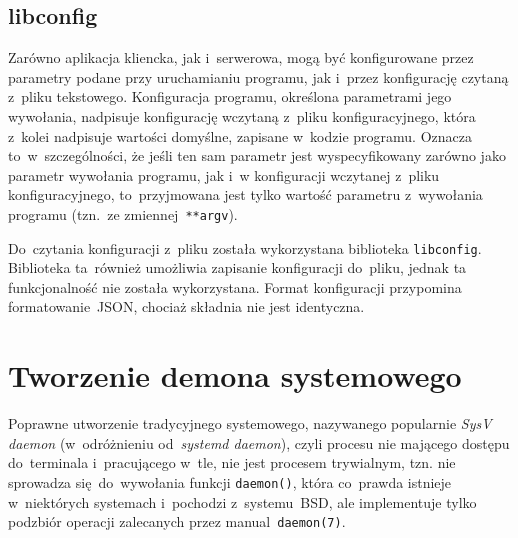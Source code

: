 \documentclass[thesis]{subfiles}
\begin{document}

\subsection{libconfig}

Zarówno aplikacja kliencka, jak i~serwerowa, mogą być konfigurowane przez parametry podane przy uruchamianiu programu, jak i~przez konfigurację czytaną z~pliku tekstowego. Konfiguracja programu, określona parametrami jego wywołania, nadpisuje konfigurację wczytaną z~pliku konfiguracyjnego, która z~kolei nadpisuje wartości domyślne, zapisane w~kodzie programu. Oznacza to~w~szczególności, że jeśli ten sam parametr jest wyspecyfikowany zarówno jako parametr wywołania programu, jak i~w konfiguracji wczytanej z~pliku konfiguracyjnego, to~przyjmowana jest tylko wartość parametru z~wywołania programu (tzn.~ze zmiennej~\texttt{**argv}).

Do~czytania konfiguracji z~pliku została wykorzystana biblioteka \texttt{libconfig}. Biblioteka ta~również umożliwia zapisanie konfiguracji do~pliku, jednak ta funkcjonalność nie została wykorzystana. Format konfiguracji przypomina formatowanie~JSON, chociaż składnia nie jest identyczna.


\section{Tworzenie demona systemowego}

Poprawne utworzenie tradycyjnego   systemowego, nazywanego popularnie \emph{SysV daemon} (w~odróżnieniu od~\emph{systemd daemon}), czyli procesu nie mającego dostępu do~terminala i~pracującego w~tle, nie jest procesem trywialnym, tzn. nie sprowadza się~do~wywołania funkcji \texttt{daemon()}, która co~prawda istnieje w~niektórych systemach i~pochodzi z~systemu~BSD, ale implementuje tylko podzbiór operacji zalecanych przez manual~\texttt{daemon(7)}.
\end{document}

